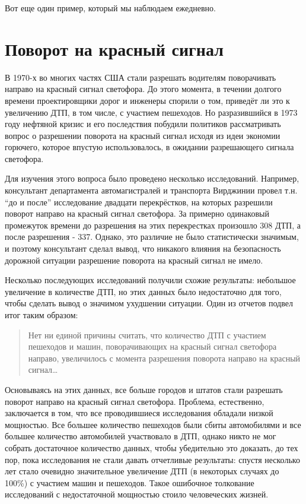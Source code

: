 Вот еще один пример, который мы наблюдаем ежедневно.

\section{Поворот на красный сигнал}
\label{chp3:wrongturnred}

В 1970-х во многих частях США стали разрешать водителям поворачивать направо на красный сигнал светофора. До этого момента, в течении долгого времени проектировщики дорог и инженеры спорили о том, приведёт ли это к увеличению ДТП, в том числе, с участием пешеходов. Но разразившийся в 1973 году нефтяной кризис и его последствия побудили политиков рассматривать вопрос о разрешении поворота на красный сигнал исходя из идеи экономии горючего, которое впустую использовалось, в ожидании разрешающего сигнала светофора. 

Для изучения этого вопроса было проведено несколько исследований. Например, консультант департамента автомагистралей и транспорта Вирджинии провел т.н. ``до и после'' исследование двадцати перекрёстков, на которых разрешили поворот направо на красный сигнал светофора. За примерно одинаковый промежуток времени до разрешения на этих перекрестках произошло 308 ДТП, а после разрешения - 337. Однако, это различие не было статистически значимым, и поэтому консультант сделал вывод, что никакого влияния на безопасность дорожной ситуации разрешение поворота на красный сигнал не имело.

Несколько последующих исследований получили схожие результаты: небольшое увеличение в количестве ДТП, но этих данных было недостаточно для того, чтобы сделать вывод о значимом ухудшении ситуации. Один из отчетов подвел итог таким образом: 

\begin{quotation}
Нет ни единой причины считать, что количество ДТП с участием пешеходов и машин, поворачивающих на красный сигнал светофора направо, увеличилось с момента разрешения поворота направо на красный сигнал\dots
\end{quotation}

Основываясь на этих данных, все больше городов и штатов стали разрешать поворот направо на красный сигнал светофора. Проблема, естественно, заключается в том, что все проводившиеся исследования обладали низкой мощностью. Все большее количество пешеходов были сбиты автомобилями и все большее количество автомобилей участвовало в ДТП, однако никто не мог собрать достаточное количество данных, чтобы убедительно это доказать, до тех пор, пока исследования не стали давать отчетливые результаты: спустя несколько лет стало очевидно значительное увеличение ДТП (в некоторых случаях до 100\%) с участием машин и пешеходов.\cite{hauer_harm_2004,preusser_effect_1982} Такое ошибочное толкование исследований с недостаточной мощностью стоило человеческих жизней.  
